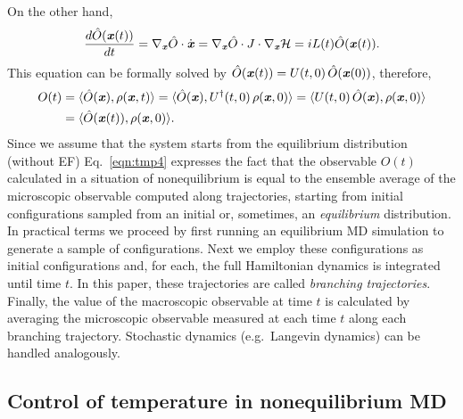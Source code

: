\documentclass[journal=jctcce,manuscript=manuscript]{achemso}
\newcommand{\vect}[1]{\textbf{\textit{#1}}}
\begin{document}
On the other hand,
\begin{align}
  \frac{d \hat O(\vect x(t))}{dt} = \nabla_{\vect x}\hat O\cdot \dot{\vect x}
  = \nabla_{\vect x}\hat O\cdot J\cdot \nabla_{\vect x}\mathcal H
  = iL(t) \hat O (\vect x(t)).
\end{align}
This equation can be formally solved by
$\hat O(\vect x(t)) = U(t,0)\,\hat O(\vect x(0))$, therefore,
\begin{align}\nonumber
  O(t) & = \langle \hat O(\vect x), \rho(\vect x, t)\rangle
  = \langle \hat O(\vect x), U^\dagger(t,0)\, \rho(\vect x, 0)\rangle
  = \langle U(t,0)\,\hat O(\vect x), \rho(\vect x, 0)\rangle\\\label{eqn:tmp4}
  &= \langle \hat O(\vect x(t)), \rho(\vect x, 0)\rangle.
\end{align}
Since we assume that the system starts from the equilibrium distribution (without EF)
 Eq.~\eqref{eqn:tmp4} expresses the fact that the 
observable $O(t)$ calculated in a situation of nonequilibrium is equal to the ensemble average of
the microscopic observable computed along trajectories, starting from
initial configurations sampled from an initial or, sometimes, an \emph{equilibrium}
distribution. In practical terms we proceed by first running an equilibrium MD simulation
to generate a sample of configurations. Next we employ these configurations as
initial configurations and, for each, the full Hamiltonian dynamics is integrated until
time $t$.
In this paper, these trajectories are called \emph{branching
  trajectories}.
Finally, the value of the macroscopic observable at time $t$ is
calculated by averaging the microscopic observable measured at each time $t$ along each branching trajectory.
Stochastic dynamics (e.g.~Langevin dynamics) can be handled analogously.




\subsection{Control of temperature in nonequilibrium MD}\label{sec:tmp2b}
\end{document}
